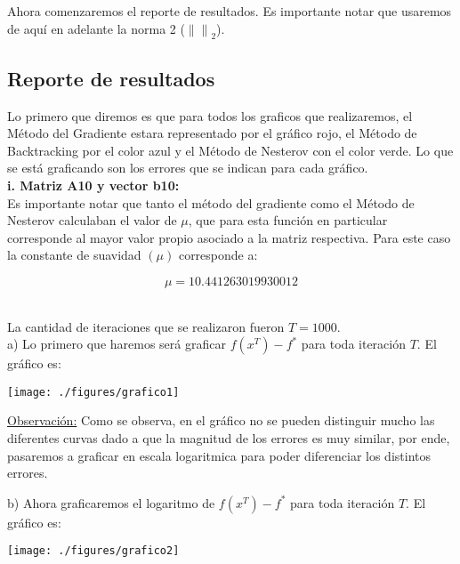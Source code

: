 \documentclass[11pt]{article}
\begin{document}
Ahora comenzaremos el reporte de resultados. Es importante notar que usaremos de aquí en adelante la norma 2 ($  \left\| \right\|_2 $).

\hrulefill

\newpage

\subsection*{Reporte de resultados}

Lo primero que diremos es que para todos los graficos que realizaremos, el Método del Gradiente estara representado por el gráfico rojo, el Método de Backtracking por el color azul y el Método de Nesterov con el color verde. Lo que se está graficando son los errores que se indican para cada gráfico. \\

\textbf{i. Matriz A10 y vector b10:} \\

Es importante notar que tanto el método del gradiente como el Método de Nesterov calculaban el valor de $\mu$, que para esta función en particular corresponde al mayor valor propio asociado a la matriz respectiva. Para este caso la constante de suavidad $(\mu)$ corresponde a:

\[ \mu = 10.441263019930012 \] \

La cantidad de iteraciones que se realizaron fueron $T=1000$. \\

a) Lo primero que haremos será graficar $ f(x^T) - f^{*}$ para toda iteración $T$. El gráfico es:

\begin{center}
\texttt{[image: ./figures/grafico1]}
\end{center}

\underline{Observación:} Como se observa, en el gráfico no se pueden distinguir mucho las diferentes curvas dado a que la magnitud de los errores es muy similar, por ende, pasaremos a graficar en escala logaritmica para poder diferenciar los distintos errores. \\

\newpage

b) Ahora graficaremos el logaritmo de $ f(x^T) - f^{*}$ para toda iteración $T$. El gráfico es:

\begin{center}
\texttt{[image: ./figures/grafico2]}
\end{center}
\end{document}
